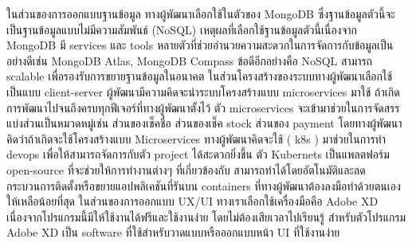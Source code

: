 ในส่วนของการออกแบบฐานข้อมูล ทางผู้พัฒนาเลือกใช้ในตัวของ MongoDB \cite{MongoDB} ซึ่งฐานข้อมูลตัวนี้จะเป็นฐานข้อมูลแบบไม่มีความสัมพันธ์ (NoSQL) 
เหตุผลที่เลือกใช้ฐานข้อมูลตัวนี้เนื่องจาก MongoDB มี services และ tools หลายตัวที่ช่วยอำนวยความสะดวกในการจัดการกับข้อมูลเป็นอย่างดีเช่น MongoDB Atlas, MongoDB Compass 
ข้อดีอีกอย่างคือ NoSQL สามารถ scalable เพื่อรองรับการขยายฐานข้อมูลในอนาคต ในส่วนโครงสร้างของระบบทางผู้พัฒนาเลือกใช้เป็นแบบ client-server \cite{Client-Server}   ผู้พัฒนามีความคิดจะนำระบบโครงสร้างแบบ microservices \cite{Microservice} มาใช้ ถ้าเกิดการพัฒนาไปจนถึงครบทุกฟีเจอร์ที่ทางผู้พัฒนาตั้งไว้  
ตัว microservices จะเข้ามาช่วยในการจัดสรรแบ่งส่วนเป็นหมวดหมู่เช่น  ส่วนของเช็คชื่อ  ส่วนของเช็ค stock  ส่วนของ payment  โดยทางผู้พัฒนาคิดว่าถ้าเกิดจะใช้โครงสร้างแบบ Microservices ทางผู้พัฒนาคิดจะใช้  ( k8s ) มาช่วยในการทำ devops เพื่อให้สามารถจัดการกับตัว project ได้สะดวกยิ่งขึ้น 
ตัว Kubernets เป็นแพลตฟอร์ม open-source ที่จะช่วยให้การทำงานต่างๆ ที่เกี่ยวข้องกับ  สามารถทำได้โดยอัตโนมัติและลดกระบวนการติดตั้งหรือขยายแอปพลิเคชันที่รันบน containers ที่ทางผู้พัฒนาต้องลงมือทำด้วยตนเองให้เหลือน้อยที่สุด 
	ในส่วนของการออกแบบ UX/UI ทางเราเลือกใช้เครื่องมือคือ Adobe XD \cite{AdobeXD} เนื่องจากโปรแกรมนี้มีให้ใช้งานได้ฟรีและใช้งานง่าย โดยไม่ต้องเสียเวลาไปเรียนรู้ สำหรับตัวโปรแกรม Adobe XD เป็น software ที่ใช้สำหรับวาดแบบหรือออกแบบหน้า UI ที่ใช้งานง่าย 
  
  

